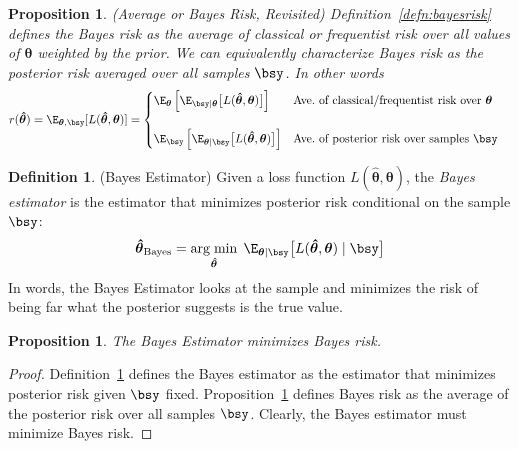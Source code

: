 \documentclass[12pt]{article}
\theoremstyle{plain}
\newtheorem{prop}[thm]{Proposition}
\theoremstyle{definition}
\newtheorem{defn}[thm]{Definition}
\theoremstyle{remark}
\newcommand{\bstheta}{\boldsymbol{\theta}}
\newcommand{\bshattheta}{\boldsymbol{\hat{\theta}}}
\DeclareMathOperator*{\argmin}{arg\;min}
\begin{document}
\begin{prop}\emph{(Average or Bayes Risk, Revisited)}
\label{prop:bayesrisk}
Definition~\ref{defn:bayesrisk} defines the Bayes risk as the average of
classical or frequentist risk over all values of $\bstheta$ weighted by
the prior. We can equivalently characterize Bayes risk as the posterior
risk averaged over all samples $\bsy$. In other words
\begin{align*}
  r(\bshattheta)
  &= \E_{\bstheta,\bsy}[L(\bshattheta,\bstheta)]
  =
  \begin{cases}
    \E_{\bstheta}\left[
      \E_{\bsy|\bstheta}\big[
        L(\bshattheta,\bstheta)
      \big]
    \right]
    &\text{Ave.\ of classical/frequentist risk over $\bstheta$}
    \\
    \\
    \E_{\bsy}\left[
      \E_{\bstheta|\bsy}\big[L(\bshattheta,\bstheta)\big]
    \right]
    &\text{Ave.\ of posterior risk over samples $\bsy$} \\
  \end{cases}
\end{align*}
\end{prop}

\begin{defn}(Bayes Estimator)
\label{defn:bayesest}
Given a loss function $L(\bshattheta,\bstheta)$, the
\emph{Bayes estimator} is the estimator that minimizes posterior risk
conditional on the sample $\bsy$:
\begin{align*}
  \bshattheta_{\text{Bayes}}
  = \argmin_{\bshattheta} \;
  \E_{\bstheta|\bsy}\big[
    L(\bshattheta,\bstheta)\;|\;\bsy
  \big]
\end{align*}
In words, the Bayes Estimator looks at the sample and minimizes the risk
of being far what the posterior suggests is the true value.
\end{defn}

\begin{prop}
The Bayes Estimator minimizes Bayes risk.
\end{prop}
\begin{proof}
Definition~\ref{defn:bayesest} defines the Bayes estimator as the
estimator that minimizes posterior risk given $\bsy$ fixed.
Proposition~\ref{prop:bayesrisk} defines Bayes risk as the average of
the posterior risk over all samples $\bsy$. Clearly, the Bayes
estimator must minimize Bayes risk.
\end{proof}
\end{document}
